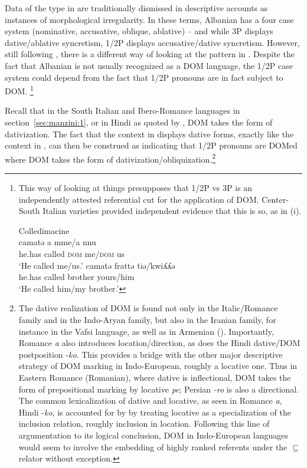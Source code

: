 \documentclass[output=paper,colorlinks,citecolor=brown]{./langscibook}
\begin{document}
Data of the type in  are traditionally dismissed in descriptive accounts as instances of morphological irregularity. In these terms, Albanian has a four case system (nominative, accusative, oblique, ablative) – and while 3P displays dative/ablative syncretism, 1/2P displays accusative/dative syncretism. However, still following \citet{ManziniSavoia2014}, there is a different way of looking at the pattern in . Despite the fact that Albanian is not usually recognized as a DOM language, the 1/2P case system could depend from the fact that 1/2P pronouns are in fact subject to DOM.{} \footnote{This way of looking at things presupposes that 1/2P vs 3P is an independently attested referential cut for the application of DOM. Center-South Italian varieties provided independent evidence that this is so, as in (i).

\ea%
    \label{ex:manzini:}
    Colledimacine \citep{ManziniSavoia2005}\\
    \ea
     {camatə} {a} {mme/a} {nnu}\\
        {he.has}  {called} \textsc{dom} {me/\textsc{dom}} {us}\\
    \glt ‘He called me/us.’
    \ex 
       {camatə} {frattə} {tiə/kwiʎʎə}\\
        {he.has}  called   brother yours/him\\
    \glt ‘He called him/my brother.’
    \z
\z
}

Recall that in the South Italian and Ibero-Romance languages in section~\ref{sec:manzini:1}, or in Hindi as quoted by \citet{Torrego1998}, DOM takes the form of dativization. The fact that the context in  displays dative forms, exactly like the context in , can then be construed as indicating that 1/2P pronouns are DOMed where DOM takes the form of dativization/obliquization.\footnote{{ The dative realization of DOM is found not only in the Italic/Romance family and in the Indo-Aryan family, but also in the Iranian family, for instance in the Vafsi language, as well as in Armenian (\citealt{ManziniFranco2016}). Importantly, Romance \textit{a} also introduces location/direction, as does the Hindi dative/DOM postposition -\textit{ko}.} This provides a bridge with the other major descriptive strategy of DOM marking in Indo-European, roughly a locative one. Thus in Eastern Romance (Romanian), where dative is inflectional, DOM takes the form of prepositional marking by locative \textit{pe}; Persian \textit{{}-ro} is also a directional.  The common lexicalization of dative and locative, as seen in Romance \textit{a}, Hindi -\textit{ko}, is accounted for by \citet{FrancoManzini2017Ins} by treating locative as a specialization of the inclusion relation, roughly inclusion in location. Following this line of argumentation to its logical conclusion, DOM in Indo-European languages would seem to involve the embedding of highly ranked referents under the \textrm{${\subseteq}$} relator without exception.}  
\end{document}
